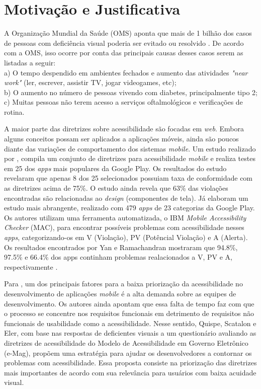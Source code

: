 \section{Motivação e Justificativa}
A Organização Mundial da Saúde (OMS) aponta que mais de 1 bilhão dos casos de pessoas com deficiência visual poderia ser evitado ou resolvido . De acordo com a OMS, isso ocorre por conta das principais causas desses casos serem as listadas a seguir:\\
a) O tempo despendido em ambientes fechados e aumento das atividades \textit{"near work"} (ler, escrever, assistir TV, jogar videogames, etc);\\
b) O aumento no número de pessoas vivendo com diabetes, principalmente tipo 2;\\
c) Muitas pessoas não terem acesso a serviços oftalmológicos e verificações de rotina.

A maior parte das diretrizes sobre acessibilidade são focadas em \textit{web}. Embora alguns conceitos possam ser aplicados a aplicações móveis, ainda são poucos diante das variações de comportamento dos sistemas \textit{mobile}. Um estudo realizado por , compila um conjunto de diretrizes para acessibilidade \textit{mobile} e realiza testes em 25 dos \textit{apps} mais populares da Google Play. Os resultados do estudo revelaram que apenas 8 dos 25 selecionados possuiam taxa de conformidade com as diretrizes acima de 75\%. O estudo ainda revela que 63\% das violações encontradas são relacionadas ao \textit{design} (componentes de tela). Já  elaboram um estudo mais abrangente, realizado com 479 \textit{apps} de 23 categorias da Google Play. Os autores utilizam uma ferramenta automatizada, o IBM \textit{Mobile Accessibility Checker} (MAC), para encontrar possíveis problemas com acessibilidade nesses \textit{apps}, categorizando-os em V (Violação), PV (Potêncial Violação) e A (Alerta). Os resultados encontrados por Yan e Ramachandran mostraram que 94.8\%, 97.5\% e 66.4\% dos apps continham problemas realacionados a V, PV e A, respectivamente \cite{Yan2019}.

Para , um dos principais fatores para a baixa priorização da acessibilidade no desenvolvimento de aplicações \textit{mobile} é a alta demanda sobre as equipes de desenvolvimento. Os autores ainda apontam que essa falta de tempo faz com que o processo se concentre nos requisitos funcionais em detrimento de requisitos não funcionais de usabilidade como a acessibilidade. Nesse sentido, Quispe, Scatalon e Eler, com base nas respostas de deficientes visuais a um questionário avaliando as diretrizes de acessibilidade do  Modelo de Acessibilidade em Governo Eletrônico (e-Mag), propõem uma estratégia para ajudar os desenvolvedores a contornar os problemas com acessibilidade. Essa proposta consiste na priorização das diretrizes mais importantes de acordo com sua relevância para usuários com baixa acuidade visual.

